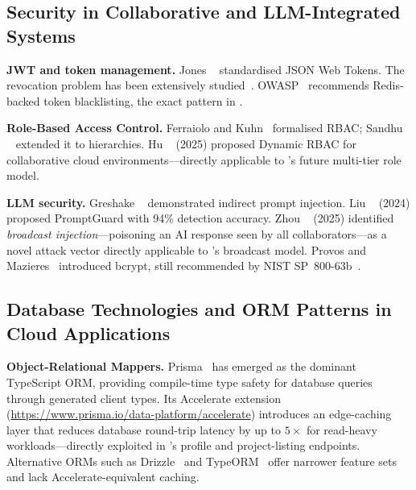 \subsection{Security in Collaborative and LLM-Integrated Systems}
\label{sub:security_lit}

\textbf{JWT and token management.}
Jones \etal~\cite{jones2015rfc7519} standardised JSON Web Tokens. The
revocation problem has been extensively studied~\cite{almohri2023security}.
OWASP~\cite{owasp2024jwt} recommends Redis-backed token blacklisting, the
exact pattern in \echoray{}.

\textbf{Role-Based Access Control.}
Ferraiolo and Kuhn~\cite{ferraiolo1992role} formalised RBAC; Sandhu
\etal~\cite{sandhu1996role} extended it to hierarchies. Hu
\etal~\cite{hu2025dynamic} (2025) proposed Dynamic RBAC for collaborative cloud
environments---directly applicable to \echoray{}'s future multi-tier role model.

\textbf{LLM security.}
Greshake \etal~\cite{greshake2023indirect} demonstrated indirect prompt
injection. Liu \etal~\cite{liu2024promptguard} (2024) proposed PromptGuard
with 94\% detection accuracy. Zhou \etal~\cite{zhou2025llmsec} (2025)
identified \emph{broadcast injection}---poisoning an AI response seen by all
collaborators---as a novel attack vector directly applicable to \echoray{}'s
broadcast model. Provos and Mazieres~\cite{provos1999bcrypt} introduced bcrypt,
still recommended by NIST SP~800-63b~\cite{nist2024sp800}.

\subsection{Database Technologies and ORM Patterns in Cloud Applications}
\label{sub:db_lit}

\textbf{Object-Relational Mappers.}
Prisma~\cite{prisma2024} has emerged as the dominant TypeScript ORM, providing
compile-time type safety for database queries through generated client types.
Its Accelerate extension~\cite{prismaaccelerate2024}
(\url{https://www.prisma.io/data-platform/accelerate}) introduces an
edge-caching layer that reduces database round-trip latency by up to $5\times$
for read-heavy workloads---directly exploited in \echoray{}'s profile and
project-listing endpoints. Alternative ORMs such as Drizzle~\cite{drizzle2024}
and TypeORM~\cite{typeorm2023} offer narrower feature sets and lack
Accelerate-equivalent caching.

